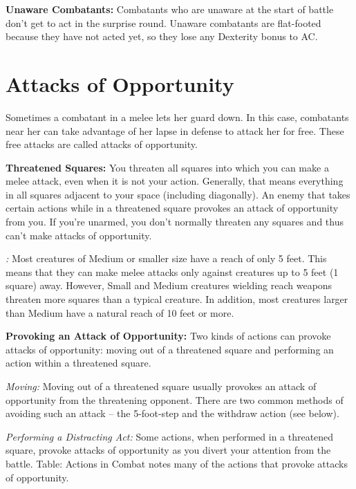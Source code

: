 \textbf{Unaware Combatants:} Combatants who are unaware at the start of battle 
don't get to act in the surprise round. Unaware combatants are flat-footed because 
they have not acted yet, so they lose any Dexterity bonus to AC.

\section{Attacks of Opportunity}

Sometimes a combatant in a melee lets her guard down. In this case, combatants 
near her can take advantage of her lapse in defense to attack her for free. These 
free attacks are called attacks of opportunity.

\textbf{Threatened Squares:} You threaten all squares into which you can make a 
melee attack, even when it is not your action. Generally, that means everything 
in all squares adjacent to your space (including diagonally). An enemy that takes 
certain actions while in a threatened square provokes an attack of opportunity 
from you. If you're unarmed, you don't normally threaten any squares and thus can't 
make attacks of opportunity.

\textit{:} Most creatures of Medium or smaller size have a reach of 
only 5 feet. This means that they can make melee attacks only against creatures 
up to 5 feet (1 square) away. However, Small and Medium creatures wielding reach 
weapons threaten more squares than a typical creature. In addition, most creatures 
larger than Medium have a natural reach of 10 feet or more.

\textbf{Provoking an Attack of Opportunity:} Two kinds of actions can provoke attacks 
of opportunity: moving out of a threatened square and performing an action within 
a threatened square.

\textit{Moving:} Moving out of a threatened square usually provokes an attack of 
opportunity from the threatening opponent. There are two common methods of avoiding 
such an attack -- the 5-foot-step and the withdraw action (see below).

\textit{Performing a Distracting Act:} Some actions, when performed in a threatened 
square, provoke attacks of opportunity as you divert your attention from the battle. 
Table: Actions in Combat notes many of the actions that provoke attacks of opportunity.

